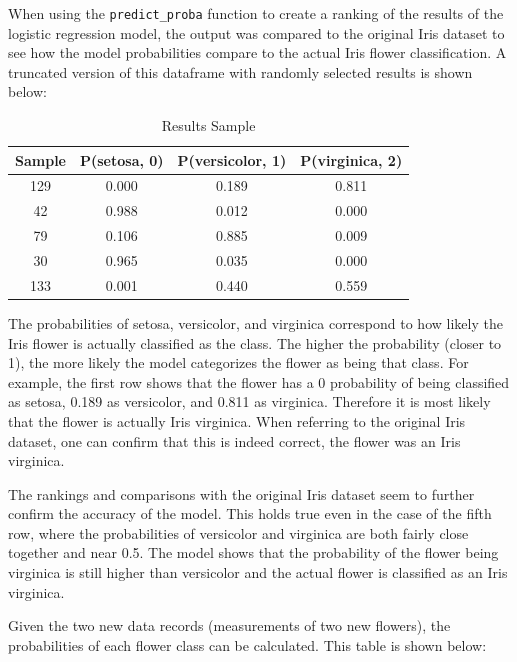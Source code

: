 \documentclass[journal]{IEEEtran}
\begin{document}
When using the \lstinline{predict_proba} function to create a ranking of the results of the logistic regression model, the output was compared to the original Iris dataset to see how the model probabilities compare to the actual Iris flower classification. A truncated version of this dataframe with randomly selected results is shown below:

\begin{table}[h!]
\centering
\begin{tabular}{ c | c c c }
Sample & P(setosa, 0) &	P(versicolor, 1) & P(virginica, 2) \\ 
\hline
129	& 0.000	& 0.189	& 0.811 \\
42	& 0.988	& 0.012	& 0.000 \\
79	& 0.106	& 0.885	& 0.009 \\
30	& 0.965	& 0.035	& 0.000 \\
133	& 0.001	& 0.440	& 0.559
\end{tabular}
\caption{Results Sample}
\label{table:model-comparison-table}
\end{table}

\vspace{30px}
The probabilities of setosa, versicolor, and virginica correspond to how likely the Iris flower is actually classified as the class. The higher the probability (closer to 1), the more likely the model categorizes the flower as being that class. For example, the first row shows that the flower has a 0 probability of being classified as setosa, 0.189 as versicolor, and 0.811 as virginica. Therefore it is most likely that the flower is actually Iris virginica. When referring to the original Iris dataset, one can confirm that this is indeed correct, the flower was an Iris virginica. 

The rankings and comparisons with the original Iris dataset seem to further confirm the accuracy of the model. This holds true even in the case of the fifth row, where the probabilities of versicolor and virginica are both fairly close together and near 0.5. The model shows that the probability of the flower being virginica is still higher than versicolor and the actual flower is classified as an Iris virginica. 

Given the two new data records (measurements of two new flowers), the probabilities of each flower class can be calculated. This table is shown below: 
    
\end{document}
